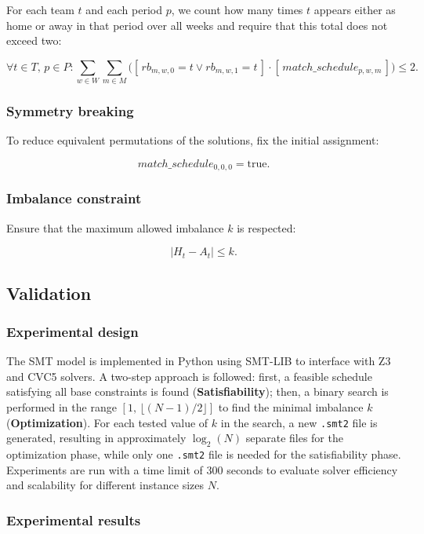 For each team $t$ and each period $p$, we count how many times $t$ appears either as home or away in that period over all weeks and require that this total does not exceed two:

\[
\forall t \in T,\, p \in P: 
\sum_{w \in W} \sum_{m \in M} 
\big(
[\,rb_{m,w,0} = t \lor rb_{m,w,1} = t\,] \cdot [\,match\_schedule_{p,w,m}\,]
\big) \leq 2.
\]

\subsubsection{Symmetry breaking}

To reduce equivalent permutations of the solutions, fix the initial assignment:

\[
match\_schedule_{0,0,0} = \text{true}.
\]

\subsubsection{Imbalance constraint}

Ensure that the maximum allowed imbalance $k$ is respected:

\[
|H_t - A_t| \leq k.
\]

\subsection{Validation}

\subsubsection{Experimental design}

The SMT model is implemented in Python using SMT-LIB to interface with Z3 and CVC5 solvers. A two-step approach is followed: first, a feasible schedule satisfying all base constraints is found (\textbf{Satisfiability}); then, a binary search is performed in the range $[1,\, \lfloor(N-1)/2\rfloor]$ to find the minimal imbalance $k$ (\textbf{Optimization}). For each tested value of $k$ in the search, a new \texttt{.smt2} file is generated, resulting in approximately $\log_2(N)$ separate files for the optimization phase, while only one \texttt{.smt2} file is needed for the satisfiability phase. Experiments are run with a time limit of 300 seconds to evaluate solver efficiency and scalability for different instance sizes $N$.


\subsubsection{Experimental results}

